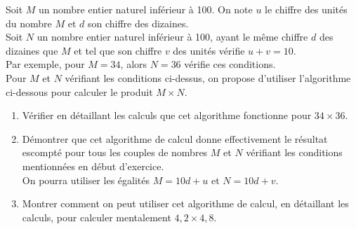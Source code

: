 \bigskip


\begin{exercice} %
   Soit $M$ un nombre entier naturel inférieur à 100. On note $u$ le chiffre des unités du nombre $M$ et $d$ son chiffre des dizaines. \\
   Soit $N$ un nombre entier naturel inférieur à 100, ayant le même chiffre $d$ des dizaines que $M$ et tel que son chiffre $v$ des unités vérifie $u+v =10$. \\
   Par exemple, pour $M =34$, alors $N =36$ vérifie ces conditions. \\
   Pour $M$ et $N$ vérifiant les conditions ci-dessus, on propose d’utiliser l’algorithme ci-dessous pour calculer le produit $M\times N$.
  \begin{center}
  \end{center}
  \begin{enumerate}
     \item Vérifier en détaillant les calculs que cet algorithme fonctionne pour $34\times36$.
      \item Démontrer que cet algorithme de calcul donne effectivement le résultat escompté pour tous les couples de nombres $M$ et $N$ vérifiant les conditions mentionnées en début d’exercice. \\
      On pourra utiliser les égalités $M =10d+u$ et $N =10d+v$.
      \item Montrer comment on peut utiliser cet algorithme de calcul, en détaillant les calculs, pour calculer mentalement $4,2\times4,8$.
  \end{enumerate}
\end{exercice}

